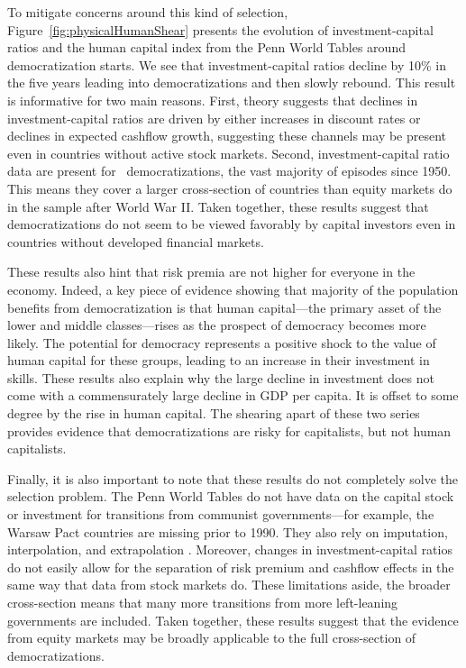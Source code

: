 \documentclass[12pt]{article}
\numberwithin{equation}{section}
\begin{document}
To mitigate concerns around this kind of selection, Figure~\ref{fig:physicalHumanShear} presents the evolution of investment-capital ratios and the human capital index from the Penn World Tables around democratization starts. We see that investment-capital ratios decline by 10\% in the five years leading into democratizations and then slowly rebound. This result is informative for two main reasons. First, theory suggests that declines in investment-capital ratios are driven by either increases in discount rates or declines in expected cashflow growth, suggesting these channels may be present even in countries without active stock markets. Second, investment-capital ratio data are present for \demEpisodesIK\ democratizations, the vast majority of episodes since 1950. This means they cover a larger cross-section of countries than equity markets do in the sample after World War II. Taken together, these results suggest that democratizations do not seem to be viewed favorably by capital investors even in countries without developed financial markets.

These results also hint that risk premia are not higher for everyone in the economy. Indeed, a key piece of evidence showing that majority of the population benefits from democratization is that human capital---the primary asset of the lower and middle classes---rises as the prospect of democracy becomes more likely. The potential for democracy represents a positive shock to the value of human capital for these groups, leading to an increase in their investment in skills. These results also explain why the large decline in investment does not come with a commensurately large decline in GDP per capita. It is offset to some degree by the rise in human capital. The shearing apart of these two series provides evidence that democratizations are risky for capitalists, but not human capitalists.

Finally, it is also important to note that these results do not completely solve the selection problem. The Penn World Tables do not have data on the capital stock or investment for transitions from communist governments---for example, the Warsaw Pact countries are missing prior to 1990. They also rely on imputation, interpolation, and extrapolation \citep{Feenstra2015}. Moreover, changes in investment-capital ratios do not easily allow for the separation of risk premium and cashflow effects in the same way that data from stock markets do. These limitations aside, the broader cross-section means that many more transitions from more left-leaning governments are included. Taken together, these results suggest that the evidence from equity markets may be broadly applicable to the full cross-section of democratizations.
\label{par:agg_invest_end}
\end{document}
